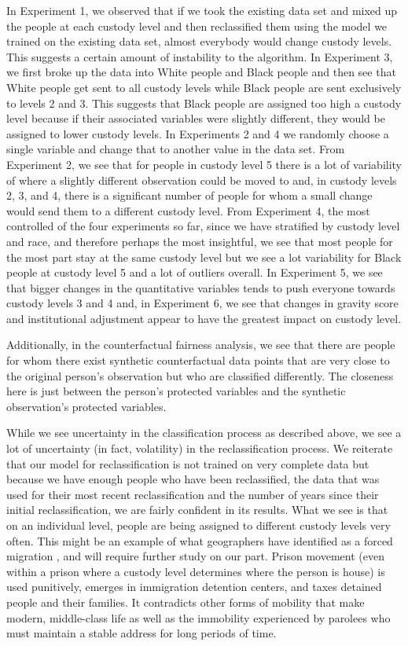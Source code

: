 \documentclass{amsproc}
\numberwithin{equation}{section}
\theoremstyle{plain}
\theoremstyle{remark}
\begin{document}
In Experiment 1, we observed that if we took the existing data set and mixed up the people at each custody level and then reclassified them using the model we trained on the existing data set, almost everybody would change custody levels.  This suggests a certain amount of instability to the algorithm.  In Experiment 3, we first broke up the data into White people and Black people and then see that White people get sent to all custody levels while Black people are sent exclusively to levels 2 and 3.  This suggests that Black people are assigned too high a custody level because if their associated variables were slightly different, they would be assigned to lower custody levels.  In Experiments 2 and 4 we randomly choose a single variable and change that to another value in the data set.  From Experiment 2, we see that for people in custody level 5 there is a lot of variability of where a slightly different observation could be moved to and, in custody levels 2, 3, and 4, there is a significant number of people for whom a small change would send them to a different custody level.  From Experiment 4, the most controlled of the four experiments so far, since we have stratified by custody level and race, and therefore perhaps the most insightful, we see that most people for the most part stay at the same custody level but we see a lot variability for Black people at custody level 5 and a lot of outliers overall.  In Experiment 5, we see that bigger changes in the quantitative variables tends to push everyone towards custody levels 3 and 4 and, in Experiment 6, we see that changes in gravity score and institutional adjustment appear to have the greatest impact on custody level.

Additionally, in the counterfactual fairness analysis, we see that there are people for whom there exist synthetic counterfactual data points that are very close to the original person's observation but who are classified differently.  The closeness here is just between the person's protected variables and the synthetic observation's protected variables.

While we see uncertainty in the classification process as described above, we see a lot of uncertainty (in fact, volatility) in the reclassification process.  We reiterate that our model for reclassification is not trained on very complete data but because we have enough people who have been reclassified, the data that was used for their most recent reclassification and the number of years since their initial reclassification, we are fairly confident in its results.  What we see is that on an individual level, people are being assigned to different custody levels very often.  This might be an example of what geographers have identified as a forced migration \cite{gill}, and will require further study on our part. Prison movement (even within a prison where a custody level determines where the person is house) is used punitively, emerges in immigration detention centers, and taxes detained people and their families. It contradicts other forms of mobility that make modern, middle-class life as well as the immobility experienced by parolees who must maintain a stable address for long periods of time.
 
\end{document}
